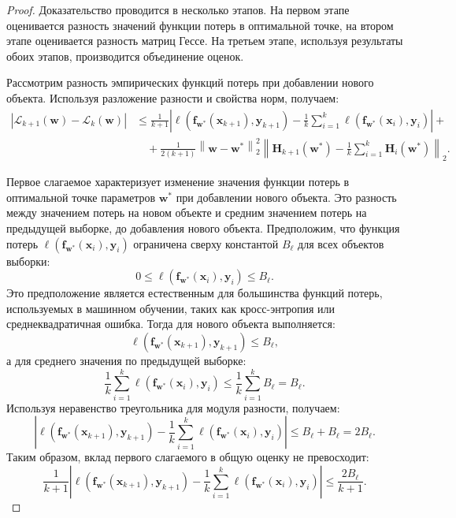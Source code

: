 \begin{proof}
Доказательство проводится в несколько этапов. На первом этапе оценивается разность значений функции потерь в оптимальной точке, на втором этапе оценивается разность матриц Гессе. На третьем этапе, используя результаты обоих этапов, производится объединение оценок.

Рассмотрим разность эмпирических функций потерь при добавлении нового объекта. Используя разложение разности и свойства норм, получаем:
\begin{align}
    \left| \mathcal{L}_{k+1}(\mathbf{w}) - \mathcal{L}_k(\mathbf{w}) \right| &\leqslant \frac{1}{k+1} \left| \ell(\mathbf{f}_{\mathbf{w}^*}(\mathbf{x}_{k+1}), \mathbf{y}_{k+1}) - \frac{1}{k} \sum_{i=1}^{k} \ell(\mathbf{f}_{\mathbf{w}^*}(\mathbf{x}_{i}), \mathbf{y}_{i}) \right| +\\
    &\quad+ \frac{1}{2 (k+1)} \left\| \mathbf{w} - \mathbf{w}^* \right\|_2^2 \left\| \mathbf{H}_{k+1}(\mathbf{w}^*) - \frac{1}{k} \sum_{i=1}^{k} \mathbf{H}_i(\mathbf{w}^*) \right\|_2.
\end{align}

Первое слагаемое характеризует изменение значения функции потерь в оптимальной точке параметров $\mathbf{w}^*$ при добавлении нового объекта.
Это разность между значением потерь на новом объекте и средним значением потерь на предыдущей выборке, до добавления нового объекта.
Предположим, что функция потерь $\ell(\mathbf{f}_{\mathbf{w}^*}(\mathbf{x}_i), \mathbf{y}_i)$ ограничена сверху константой $B_{\ell}$ для всех объектов выборки:
\[
    0 \leqslant \ell(\mathbf{f}_{\mathbf{w}^*}(\mathbf{x}_i), \mathbf{y}_i) \leqslant B_{\ell}.
\]
Это предположение является естественным для большинства функций потерь, используемых в машинном обучении, таких как кросс-энтропия или среднеквадратичная ошибка.
Тогда для нового объекта выполняется:
\[
    \ell(\mathbf{f}_{\mathbf{w}^*}(\mathbf{x}_{k+1}), \mathbf{y}_{k+1}) \leqslant B_{\ell},
\]
а для среднего значения по предыдущей выборке:
\[
    \frac{1}{k} \sum_{i=1}^{k} \ell(\mathbf{f}_{\mathbf{w}^*}(\mathbf{x}_{i}), \mathbf{y}_{i}) \leqslant \frac{1}{k} \sum_{i=1}^{k} B_{\ell} = B_{\ell}.
\]
Используя неравенство треугольника для модуля разности, получаем:
\[
    \left| \ell(\mathbf{f}_{\mathbf{w}^*}(\mathbf{x}_{k+1}), \mathbf{y}_{k+1}) - \frac{1}{k} \sum_{i=1}^{k} \ell(\mathbf{f}_{\mathbf{w}^*}(\mathbf{x}_{i}), \mathbf{y}_{i}) \right| \leqslant B_{\ell} + B_{\ell} = 2B_{\ell}.
\]
Таким образом, вклад первого слагаемого в общую оценку не превосходит:
\[
    \frac{1}{k+1} \left| \ell(\mathbf{f}_{\mathbf{w}^*}(\mathbf{x}_{k+1}), \mathbf{y}_{k+1}) - \frac{1}{k} \sum_{i=1}^{k} \ell(\mathbf{f}_{\mathbf{w}^*}(\mathbf{x}_{i}), \mathbf{y}_{i}) \right| \leqslant \frac{2B_{\ell}}{k+1}.
\]


\end{proof}
